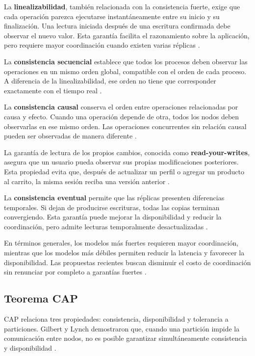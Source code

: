 \documentclass[11pt,a4paper]{article}
\begin{document}
La \textbf{linealizabilidad}, también relacionada con la consistencia fuerte, exige que cada operación parezca ejecutarse instantáneamente entre su inicio y su finalización. Una lectura iniciada después de una escritura confirmada debe observar el nuevo valor. Esta garantía facilita el razonamiento sobre la aplicación, pero requiere mayor coordinación cuando existen varias réplicas \cite{viotti2016}.

La \textbf{consistencia secuencial} establece que todos los procesos deben observar las operaciones en un mismo orden global, compatible con el orden de cada proceso. A diferencia de la linealizabilidad, ese orden no tiene que corresponder exactamente con el tiempo real \cite{viotti2016}.

La \textbf{consistencia causal} conserva el orden entre operaciones relacionadas por causa y efecto. Cuando una operación depende de otra, todos los nodos deben observarlas en ese mismo orden. Las operaciones concurrentes sin relación causal pueden ser observadas de manera diferente \cite{viotti2016}.

La garantía de lectura de los propios cambios, conocida como \textbf{read-your-writes}, asegura que un usuario pueda observar sus propias modificaciones posteriores. Esta propiedad evita que, después de actualizar un perfil o agregar un producto al carrito, la misma sesión reciba una versión anterior \cite{viotti2016}.

La \textbf{consistencia eventual} permite que las réplicas presenten diferencias temporales. Si dejan de producirse escrituras, todas las copias terminan convergiendo. Esta garantía puede mejorar la disponibilidad y reducir la coordinación, pero admite lecturas temporalmente desactualizadas \cite{viotti2016}.

En términos generales, los modelos más fuertes requieren mayor coordinación, mientras que los modelos más débiles permiten reducir la latencia y favorecer la disponibilidad. Las propuestas recientes buscan disminuir el costo de coordinación sin renunciar por completo a garantías fuertes \cite{margara2023,zhou2023}.

\subsection{Teorema CAP}
CAP relaciona tres propiedades: consistencia, disponibilidad y tolerancia a particiones. Gilbert y Lynch demostraron que, cuando una partición impide la comunicación entre nodos, no es posible garantizar simultáneamente consistencia y disponibilidad \cite{gilbert2002}.
\end{document}
